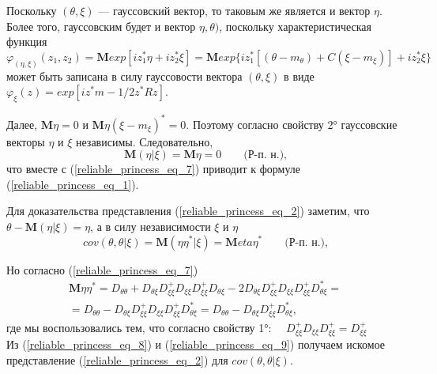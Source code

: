 Поскольку $(\theta, \xi)$ — гауссовский вектор, то таковым же
является и вектор $\eta$. Более того, гауссовским будет и вектор
$\eta, \theta)$, поскольку характеристическая функция
$$\varphi_{(\eta, \xi)}(z_1,z_2) = \mathbf{M} exp 
[iz_1^*\eta+iz_2^*\xi] = \mathbf{M} exp\{iz_1^*
[(\theta-m_\theta)+C(\xi-m_\xi)]+iz_2^*\xi\}$$
может быть записана в силу гауссовости вектора $(\theta,\xi)$ в виде $\varphi_\xi(z)=exp[iz^*m-1/2z^*Rz]$.


Далее, $\mathbf{M}\eta = 0$ и $\mathbf{M}\eta(\xi-m_\xi)^* = 0.$ Поэтому согласно свойству 2° гауссовские векторы $\eta$ и $\xi$ независимы. Следовательно,
$$\mathbf{M}(\eta|\xi) = \mathbf{M}\eta = 0 \quad \quad \text{(Р-п. н.),}$$
что вместе с (\ref{reliable_princess_eq_7}) приводит к формуле (\ref{reliable_princess_eq_1}).


Для доказательства представления (\ref{reliable_princess_eq_2}) заметим, что
$\theta-\mathbf{M}(\eta|\xi)=\eta$, а в силу независимости $\xi$ и $\eta$
\begin{equation}\label{reliable_princess_eq_8}
cov(\theta, \theta|\xi) = \mathbf{M}(\eta\eta^*|\xi)=
\mathbf{M}eta\eta^* \quad \quad \text{(Р-п. н.),} 
\end{equation}

Но согласно (\ref{reliable_princess_eq_7})
\begin{equation}\label{reliable_princess_eq_9}
	\begin{gathered}
		\mathbf{M}\eta\eta^* = D_{\theta\theta} + D_{\theta\xi}D_{\xi\xi}^+D_{\xi\xi}D_{\xi\xi}^+D_{\theta\xi}-
		2D_{\theta\xi}D_{\xi\xi}^+D_{\xi\xi}D_{\xi\xi}^+D_{\theta\xi}^*= \\
		= D_{\theta\theta} - D_{\theta\xi}D_{\xi\xi}^+D_{\xi\xi}D_{\xi\xi}^+D_{\theta\xi}^* = 
		D_{\theta\theta} - D_{\theta\xi}D_{\xi\xi}^+D_{\theta\xi}^*, 
	\end{gathered}
\end{equation}
где мы воспользовались тем, что согласно свойству 1°:
$\quad D_{\xi\xi}^+D_{\xi\xi}D_{\xi\xi}^+ = D_{\xi\xi}^+$\\


Из (\ref{reliable_princess_eq_8}) и (\ref{reliable_princess_eq_9}) получаем искомое представление (\ref{reliable_princess_eq_2})
для $cov(\theta,\theta|\xi)$.



